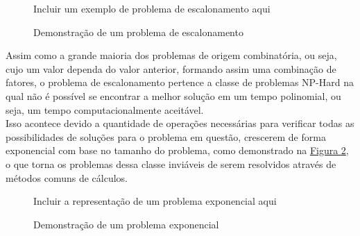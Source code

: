         \begin{figure}[ht]
            \centering
            \caption{Demonstração de um problema de escalonamento}
            \label{fig:ex-problema-escalonamento}
            \small{Incluir um exemplo de problema de escalonamento aqui}
        \end{figure}

        Assim como a grande maioria dos problemas de origem combinatória, ou seja, cujo um valor dependa do valor anterior, formando assim uma combinação de fatores, o problema de escalonamento pertence a classe de problemas NP-Hard na qual não é possível se encontrar a melhor solução em um tempo polinomial, ou seja, um tempo computacionalmente aceitável.\\
        \indent Isso acontece devido a quantidade de operações necessárias para verificar todas as possibilidades de soluções para o problema em questão, crescerem de forma exponencial com base no tamanho do problema, 
        como demonstrado na \hyperref[fig:problema-exponencial]{Figura \ref{fig:problema-exponencial}},
        o que torna os problemas dessa classe inviáveis de serem resolvidos através de métodos comuns de cálculos.\hfill
        
        \begin{figure}[h]
            \centering
            \small{Incluir a representação de um problema exponencial aqui}
            \caption{Demonstração de um problema exponencial}
            \label{fig:problema-exponencial}
        \end{figure}
        
